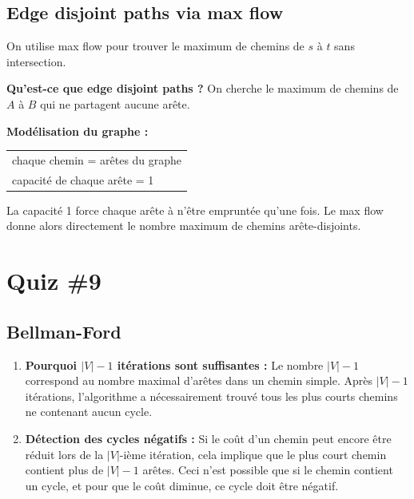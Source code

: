 \documentclass[11pt,a4paper,openany]{book}
\begin{document}
\subsection{Edge disjoint paths via max flow}

\begin{exbox}[title=Edge disjoint paths via max flow — student notes]
\small\raggedright
On utilise max flow pour trouver le maximum de chemins de $s$ à $t$ sans intersection.

\textbf{Qu'est-ce que edge disjoint paths ?} On cherche le maximum de chemins de $A$
à $B$ qui ne partagent aucune arête.

\textbf{Modélisation du graphe :}
\begin{center}
\begin{tabular}{l}
chaque chemin = arêtes du graphe \\
capacité de chaque arête = 1
\end{tabular}
\end{center}

La capacité 1 force chaque arête à n'être empruntée qu'une fois. Le max flow donne
alors directement le nombre maximum de chemins arête-disjoints.
\end{exbox}

\newpage \section{Quiz \#9}

\subsection{Bellman-Ford}

\begin{enumerate}
    \item \textbf{Pourquoi $|V|-1$ itérations sont suffisantes :} Le nombre $|V|-1$ correspond au nombre maximal d'arêtes dans un chemin simple. Après $|V|-1$ itérations, l'algorithme a nécessairement trouvé tous les plus courts chemins ne contenant aucun cycle.

    \item \textbf{Détection des cycles négatifs :} Si le coût d'un chemin peut encore être réduit lors de la $|V|$-ième itération, cela implique que le plus court chemin contient plus de $|V|-1$ arêtes. Ceci n'est possible que si le chemin contient un cycle, et pour que le coût diminue, ce cycle doit être négatif.
\end{enumerate}
\end{document}
